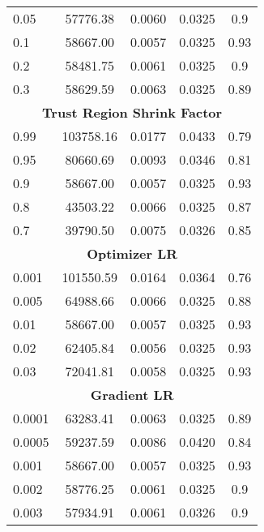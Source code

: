 \begin{longtable}[H]{lcccc}
0.05 & 57776.38 & 0.0060 & 0.0325 & 0.9 \\
0.1 & 58667.00 & 0.0057 & 0.0325 & 0.93 \\
0.2 & 58481.75 & 0.0061 & 0.0325 & 0.9 \\
0.3 & 58629.59 & 0.0063 & 0.0325 & 0.89 \\
\midrule
\multicolumn{5}{c}{\textbf{Trust Region Shrink Factor}} \\
0.99 & 103758.16 & 0.0177 & 0.0433 & 0.79 \\
0.95 & 80660.69 & 0.0093 & 0.0346 & 0.81 \\
0.9 & 58667.00 & 0.0057 & 0.0325 & 0.93 \\
0.8 & 43503.22 & 0.0066 & 0.0325 & 0.87 \\
0.7 & 39790.50 & 0.0075 & 0.0326 & 0.85 \\
\midrule
\multicolumn{5}{c}{\textbf{Optimizer LR}} \\
0.001 & 101550.59 & 0.0164 & 0.0364 & 0.76 \\
0.005 & 64988.66 & 0.0066 & 0.0325 & 0.88 \\
0.01 & 58667.00 & 0.0057 & 0.0325 & 0.93 \\
0.02 & 62405.84 & 0.0056 & 0.0325 & 0.93 \\
0.03 & 72041.81 & 0.0058 & 0.0325 & 0.93 \\
\midrule
\multicolumn{5}{c}{\textbf{Gradient LR}} \\
0.0001 & 63283.41 & 0.0063 & 0.0325 & 0.89 \\
0.0005 & 59237.59 & 0.0086 & 0.0420 & 0.84 \\
0.001 & 58667.00 & 0.0057 & 0.0325 & 0.93 \\
0.002 & 58776.25 & 0.0061 & 0.0325 & 0.9 \\
0.003 & 57934.91 & 0.0061 & 0.0326 & 0.9 \\
\midrule
\bottomrule
\end{longtable}
